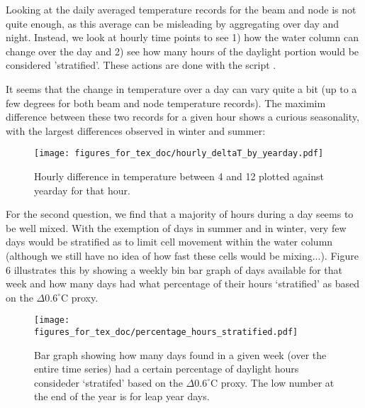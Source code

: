 \documentclass[11pt]{article}
\begin{document}
Looking at the daily averaged temperature records for the beam and node is not quite enough, as this average can be misleading by aggregating over day and night. Instead, we look at hourly time points to see 1) how the water column can change over the day and 2) see how many hours of the daylight portion would be considered 'stratified'. These actions are done with the script .

It seems that the change in temperature over a day can vary quite a bit (up to a few degrees for both beam and node temperature records). The maximim difference between these two records for a given hour shows a curious seasonality, with the largest differences observed in winter and summer:

 \begin{figure}[h]
\centering
\texttt{[image: figures\_for\_tex\_doc/hourly\_deltaT\_by\_yearday.pdf]}
\caption{Hourly difference in temperature between 4 and 12 plotted against yearday for that hour.}
\end{figure}

For the second question, we find that a majority of hours during a day seems to be well mixed. With the exemption of days in summer and in winter, very few days would be stratified as to limit cell movement within the water column (although we still have no idea of how fast these cells would be mixing...).  Figure 6 illustrates this by showing a weekly bin bar graph of days available for that week and how many days had what percentage of their hours `stratified' as based on the $\Delta0.6 ^{\circ}$C proxy.

 \begin{figure}[h]
\centering
\texttt{[image: figures\_for\_tex\_doc/percentage\_hours\_stratified.pdf]}
\caption{Bar graph showing how many days found in a given week (over the entire time series) had a certain percentage of daylight hours consideder `stratifed' based on the $\Delta0.6 ^{\circ}$C proxy. The low number at the end of the year is for leap year days.}
\end{figure}


\end{document}
